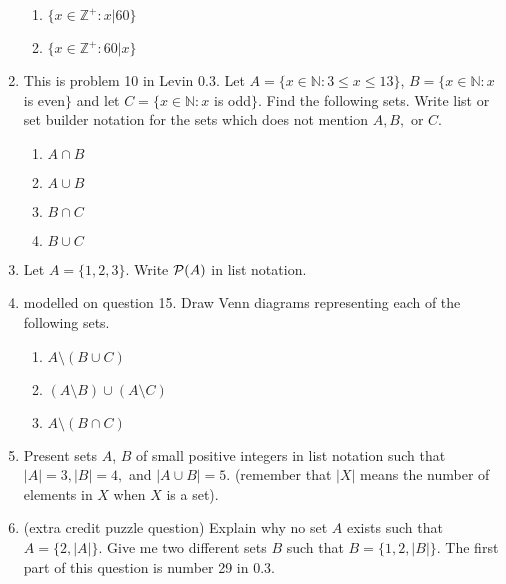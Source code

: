 \documentclass[12pt]{article}
\begin{document}
\begin{enumerate}
\begin{enumerate}
\item   $\{x \in \mathbb Z^+: x|60\}$

\item $\{x \in \mathbb Z^+:60|x\}$

\end{enumerate}

\item  This is problem 10 in Levin 0.3.  Let $A = \{x \in \mathbb N:3 \leq x \leq 13\}$, $B = \{x \in \mathbb N: x$ is even$\}$ and let $C = \{x \in \mathbb N: x$ is odd$\}$.  Find the following sets.  Write list or set builder notation for the sets which does not mention $A, B,$ or $C$.

\begin{enumerate}

\item   $A \cap B$

\item $A \cup B$

\item $B \cap C$

\item $B \cup C$


\end{enumerate}

\item Let $A = \{1,2,3\}$.  Write ${\cal P}(A)$ in list notation.

\item modelled on question 15.  Draw Venn diagrams representing each of the following sets.

\begin{enumerate}

\item $A \setminus (B \cup C)$

\item $(A \setminus B) \cup (A \setminus C)$

\item $A \setminus (B \cap C)$

\end{enumerate}

\item  Present sets $A$, $B$ of small positive integers in list notation such that $|A|=3, |B| = 4,$ and $|A \cup B| = 5$.  (remember that
$|X|$ means the number of elements in $X$ when $X$ is a set).

\item (extra credit puzzle question)  Explain why no set $A$ exists such that $A = \{2,|A|\}$.  Give me two different sets
$B$ such that $B = \{1,2,|B|\}$.  The first part of this question is number 29 in 0.3.

\end{enumerate}
\end{document}
